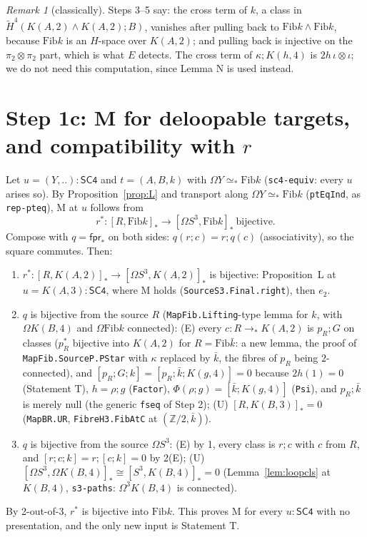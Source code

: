 \documentclass[11pt]{amsart}
\theoremstyle{definition}
\theoremstyle{remark}
\newtheorem{remark}[theorem]{Remark}
\newcommand{\Om}{\Omega}
\newcommand{\code}[1]{\texttt{#1}}
\newcommand{\Fib}{\mathrm{Fib}}
\newcommand{\fpr}{\mathsf{fpr}}
\newcommand{\SCf}{\mathsf{SC4}}
\newcommand{\pteq}{\simeq_*}
\newcommand{\Z}{\mathbb{Z}}
\newcommand{\cls}[1]{[#1]}
\begin{document}
\begin{remark}[classically]
Steps 3--5 say: the cross term of $k$, a class in $\tilde H^4(K(A,2)\wedge
K(A,2);B)$, vanishes after pulling back to $\Fib k\wedge\Fib k$, because $\Fib k$
is an $H$-space over $K(A,2)$; and pulling back is injective on the
$\pi_2\otimes\pi_2$ part, which is what $E$ detects. The cross term of
$\kappa;K(h,4)$ is $2h\,\iota\otimes\iota$; we do not need this computation,
since Lemma N is used instead.
\end{remark}

\section{Step 1c: M for deloopable targets, and compatibility with $r$}

Let $u=(Y,..):\SCf$ and $t=(A,B,k)$ with $\Om Y\pteq\Fib k$ (\code{sc4-equiv}:
every $u$ arises so). By Proposition~\ref{prop:L} and transport along $\Om
Y\pteq\Fib k$ (\code{ptEqInd}, as \code{rep-pteq}), M at $u$ follows from
\[
  r^*:[R,\Fib k]_*\to[\Om S^3,\Fib k]_*\ \text{bijective}.
\]
Compose with $q=\fpr_*$ on both sides: $q(r;c)=r;q(c)$ (associativity), so the
square commutes. Then:
\begin{enumerate}
\item $r^*:[R,K(A,2)]_*\to[\Om S^3,K(A,2)]_*$ is bijective: Proposition~L at
$u=K(A,3):\SCf$, where M holds (\code{SourceS3.Final.right}), then $e_2$.
\item $q$ is bijective from the source $R$ (\code{MapFib.Lifting}-type lemma for
$k$, with $\Om K(B,4)$ and $\Om\Fib k$ connected): (E) every $c:R\to_*K(A,2)$
is $p_R;G$ on classes ($p_R^*$ bijective into $K(A,2)$ for $R=\Fib\bar k$: a new
lemma, the proof of \code{MapFib.SourceP.PStar} with $\kappa$ replaced by
$\bar k$, the fibres of $p_R$ being $2$-connected), and $\cls{p_R;G;k}=
\cls{p_R;\bar k;K(g,4)}=0$ because $2h(1)=0$ (Statement T), $h=\rho;g$
(\code{Factor}), $\Phi(\rho;g)=\cls{\bar k;K(g,4)}$ (\code{Psi}), and
$p_R;\bar k$ is merely null (the generic \code{fseq} of Step 2); (U) $[R,K(B,3)]_*=0$ (\code{MapBR.UR},
\code{FibreH3.FibAtC} at $(\Z/2,\bar k)$).
\item $q$ is bijective from the source $\Om S^3$: (E) by 1, every class is
$r;c$ with $c$ from $R$, and $\cls{r;c;k}=r;\cls{c;k}=0$ by 2(E); (U)
$[\Om S^3,\Om K(B,4)]_*\cong[S^3,K(B,4)]_*=0$ (Lemma~\ref{lem:loopcls} at $K(B,4)$,
\code{s3-paths}: $\Om^3K(B,4)$ is connected).
\end{enumerate}
By 2-out-of-3, $r^*$ is bijective into $\Fib k$. This proves M for every
$u:\SCf$ with no presentation, and the only new input is Statement T.
\end{document}
